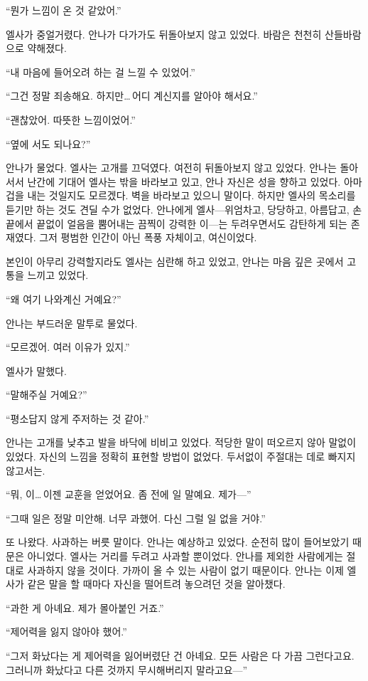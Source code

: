 ``뭔가 느낌이 온 것 같았어.''

엘사가 중얼거렸다. 안나가 다가가도 뒤돌아보지 않고 있었다. 바람은 천천히 산들바람으로 약해졌다.

``내 마음에 들어오려 하는 걸 느낄 수 있었어.''

``그건 정말 죄송해요. 하지만\ldots\,어디 계신지를 알아야 해서요.''

``괜찮았어. 따뜻한 느낌이었어.''

``옆에 서도 되나요?''

안나가 물었다. 엘사는 고개를 끄덕였다. 여전히 뒤돌아보지 않고 있었다. 안나는 돌아서서 난간에 기대어 엘사는 밖을 바라보고 있고, 안나 자신은 성을 향하고 있었다. 아마 겁을 내는 것일지도 모르겠다. 벽을 바라보고 있으니 말이다. 하지만 엘사의 목소리를 듣기만 하는 것도 견딜 수가 없었다. 안나에게 엘사—위엄차고, 당당하고, 아름답고, 손끝에서 끝없이 얼음을 뿜어내는 끔찍이 강력한 이—는 두려우면서도 감탄하게 되는 존재였다. 그저 평범한 인간이 아닌 폭풍 자체이고, 여신이었다.

본인이 아무리 강력할지라도 엘사는 심란해 하고 있었고, 안나는 마음 깊은 곳에서 고통을 느끼고 있었다.

``왜 여기 나와계신 거예요?''

안나는 부드러운 말투로 물었다.

``모르겠어. 여러 이유가 있지.''

엘사가 말했다.

``말해주실 거예요?''

``평소답지 않게 주저하는 것 같아.''

안나는 고개를 낮추고 발을 바닥에 비비고 있었다. 적당한 말이 떠오르지 않아 말없이 있었다. 자신의 느낌을 정확히 표현할 방법이 없었다. 두서없이 주절대는 데로 빠지지 않고서는.

``뭐, 이\ldots\,이젠 교훈을 얻었어요. 좀 전에 일 말예요. 제가—''

``그때 일은 정말 미안해. 너무 과했어. 다신 그럴 일 없을 거야.''

또 나왔다. 사과하는 버릇 말이다. 안나는 예상하고 있었다. 순전히 많이 들어보았기 때문은 아니었다. 엘사는 거리를 두려고 사과할 뿐이었다. 안나를 제외한 사람에게는 절대로 사과하지 않을 것이다. 가까이 올 수 있는 사람이 없기 때문이다. 안나는 이제 엘사가 같은 말을 할 때마다 자신을 떨어트려 놓으려던 것을 알아챘다.

``과한 게 아녜요. 제가 몰아붙인 거죠.''

``제어력을 잃지 않아야 했어.''

``그저 화났다는 게 제어력을 잃어버렸단 건 아녜요. 모든 사람은 다 가끔 그런다고요. 그러니까 화났다고 다른 것까지 무시해버리지 말라고요—''

